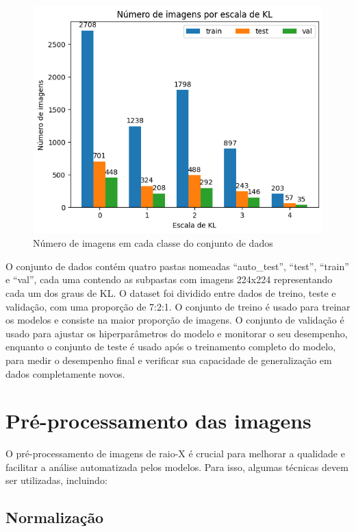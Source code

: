 \begin{figure}[h]
    \centering
    \includegraphics[width=\linewidth]{figs/num-imagens-por-escala-kl.png}
    \caption{Número de imagens em cada classe do conjunto de dados}
    \label{dataset-distribuition}
\end{figure}

O conjunto de dados contém quatro pastas nomeadas ``auto\_test'', ``test'', ``train'' e ``val'', cada uma contendo as subpastas com imagens 224x224 representando cada um dos graus de KL. O dataset foi dividido entre dados de treino, teste e validação, com uma proporção de 7:2:1. O conjunto de treino é usado para treinar os modelos e consiste na maior proporção de imagens. O conjunto de validação é usado para ajustar os hiperparâmetros do modelo e monitorar o seu desempenho, enquanto o conjunto de teste é usado após o treinamento completo do modelo, para medir o desempenho final e verificar sua capacidade de generalização em dados completamente novos.

\section{Pré-processamento das imagens}

O pré-processamento de imagens de raio-X é crucial para melhorar a qualidade e facilitar a análise automatizada pelos modelos. Para isso, algumas técnicas devem ser utilizadas, incluindo:

\subsection{Normalização}

